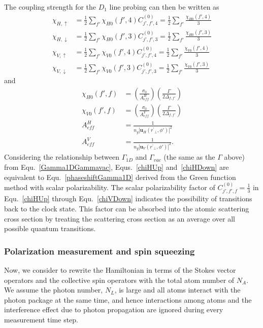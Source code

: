 \documentclass[]{report}
\begin{document}
The coupling strength for the $ D_1 $ line probing can then be written as
\begin{align}
\chi_{H,\uparrow} &=   \frac{1}{2} \sum_{f'} \chi_{H0}(f',4) C_{j',f',4}^{(0)}  =  \frac{1}{2} \sum_{f'} \frac{\chi_{H0}(f',4)}{3} \label{chiHUp}  \\
\chi_{H,\downarrow} &=   \frac{1}{2} \sum_{f'} \chi_{H0}(f',3)  C_{j',f',3}^{(0)} = \frac{1}{2} \sum_{f'} \frac{\chi_{H0}(f',3) }{3} \label{chiHDown}\\
\chi_{V,\uparrow} &=   \frac{1}{2} \sum_{f'} \chi_{V0}(f',4)  C_{j',f',4}^{(0)}  =   \frac{1}{2} \sum_{f'} \frac{\chi_{V0}(f',4)}{3}\label{chiVUp}  \\
\chi_{V,\downarrow} &=   \frac{1}{2} \sum_{f'} \chi_{V0}(f',3)  C_{j',f',3}^{(0)}=   \frac{1}{2} \sum_{f'} \frac{\chi_{V0}(f',3) }{3} \label{chiVDown}
\end{align}
and 
\begin{align}
\chi_{H0}(f',f) &= \left( \frac{ \sigma_0}{A_{ef\!f}^H} \right) \left( \frac{\Gamma}{2 \Delta_{f,f'}} \right)\\
\chi_{V0}(f',f) &= \left( \frac{ \sigma_0}{A_{ef\!f}^V} \right) \left( \frac{\Gamma}{2 \Delta_{f,f'}} \right)\\
A_{ef\!f}^H &= \frac{1}{n_g|\mathbf{u}_{H}(r^\prime\!\!_\perp,\phi')|^2}\\
A_{ef\!f}^V &= \frac{1}{n_g | \mathbf{u}_{V}(r^\prime\!\!_\perp,\phi')|^2}.\label{eq:AeffV}
\end{align}
Considering the relationship between $ \Gamma_{1D} $ and $ \Gamma_{vac} $ (the same as the $ \Gamma $ above) from Equ.~\eqref{Gamma1DGammavac}, Equs.~\eqref{chiHUp} and~\eqref{chiHDown} are equivalent to Equ.~\eqref{phaseshiftGamma1D} derived from the Green function method with scalar polarizability. The scalar polarizability factor of $ C_{j',f',f}^{(0)}=\frac{1}{3} $ in Equ.~\eqref{chiHUp} through Equ.~\eqref{chiVDown} indicates the possibility of transitions back to the clock state. This factor can be absorbed into the atomic scattering cross section by treating the scattering cross section as an average over all possible quantum transitions. 
 
\subsubsection{Polarization measurement and spin squeezing}
Now, we consider to rewrite the Hamiltonian in terms of the Stokes vector operators and the collective spin operators with the total atom number of $ N_A $. We assume the photon number, $ N_L $, is large and all atoms interact with the photon package at the same time, and hence interactions among atoms and the interference effect due to photon propagation are ignored during every measurement time step. 
\end{document}
